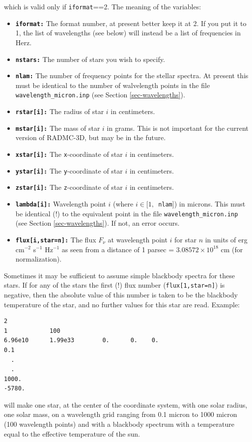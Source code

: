 \documentclass{report}
\newenvironment{asciibox}%
  {\begin{list}{}{%
    \setlength{\topsep}{0.5em}%
    \setlength{\parskip}{0em}%
    \setlength{\parsep}{0em}%
    \setlength{\itemsep}{0em}%
    \setlength{\rightmargin}{0em}%
    \setlength{\leftmargin}{3.0em}%
    \setlength{\labelsep}{1em}%
    \setlength{\labelwidth}{2em}%
  }\normalfont\footnotesize\item}
  {\end{list}}
\begin{document}
which is valid only if {\small\tt iformat}==2. The meaning of the variables:
\begin{itemize}
\item[] {\small\tt\bf iformat:} The format number, at present better keep it at 2. 
  If you put it to 1, the list of wavelengths (see below) will instead be
  a list of frequencies in Herz. 
\item[] {\small\tt\bf nstars:} The number of stars you wish to specify.
\item[] {\small\tt\bf nlam:} The number of frequency points for the stellar
  spectra. At present this must be identical to the number of walvelength
  points in the file {\small\tt wavelength\_micron.inp} (see Section \ref{sec-wavelengths}). 
\item[] {\small\tt\bf rstar[i]:} The radius of star $i$ in centimeters.
\item[] {\small\tt\bf mstar[i]:} The mass of star $i$ in grams. This is not
  important for the current version of RADMC-3D, but may be in the
  future.
\item[] {\small\tt\bf xstar[i]:} The {\small\tt x}-coordinate of star $i$ in centimeters.
\item[] {\small\tt\bf ystar[i]:} The {\small\tt y}-coordinate of star $i$ in centimeters.
\item[] {\small\tt\bf zstar[i]:} The {\small\tt z}-coordinate of star $i$ in centimeters.
\item[] {\small\tt\bf lambda[i]:} Wavelength point $i$ (where $i\in [1,${\small\tt
    nlam}$]$) in microns. This must be identical (!) to the equivalent
  point in the file {\small\tt wavelength\_micron.inp} (see Section \ref{sec-wavelengths}). If not, an error occurs.
\item[] {\small\tt\bf flux[i,star=n]:} The flux $F_\nu$ at wavelength point $i$
  for star $n$ in units of erg cm$^{-2}$ s$^{-1}$ Hz$^{-1}$ as seen from a
  distance of 1 parsec = $3.08572\times 10^{18}$ cm (for normalization).
\end{itemize}

\noindent Sometimes it may be sufficient to assume simple blackbody spectra
for these stars. If for any of the stars the first (!) flux number 
({\small\tt flux[1,star=n]}) is negative, then the absolute value of this number
is taken to be the blackbody temperature of the star, and no further values
for this star are read. Example:
\begin{asciibox}\begin{verbatim}
2
1            100
6.96e10      1.99e33        0.      0.    0.
0.1
  .
  .
1000.
-5780.
\end{verbatim}\end{asciibox}
will make one star, at the center of the coordinate system, with one solar
radius, one solar mass, on a wavelength grid ranging from 0.1 micron to 1000
micron (100 wavelength points) and with a blackbody spectrum with a
temperature equal to the effective temperature of the sun.
\end{document}
